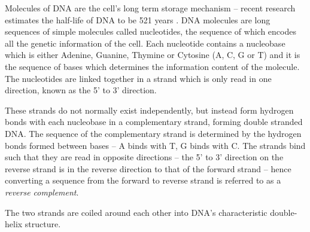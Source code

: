 Molecules of DNA are the cell's long term storage mechanism -- recent research
estimates the half-life of DNA to be 521 years \citep{DNAhalflife}.
DNA molecules are long sequences of simple molecules called nucleotides, the
sequence of  which encodes all the genetic information of the cell.
Each nucleotide contains a nucleobase which is either Adenine, Guanine,
Thymine or Cytosine (A, C, G or T) and it is the sequence of bases 
which determines the information content of the molecule.
The nucleotides are linked together in a strand which is only read in one 
direction, known as the 5' to 3' direction.

These strands do not normally exist independently, but instead form hydrogen
bonds with each nucleobase in a complementary strand, forming double stranded
DNA.
The sequence of the complementary strand is determined by the hydrogen bonds
formed between bases -- A binds with T, G binds with C.
The strands bind such that they are read in opposite directions -- the 5' to 3' 
direction on the reverse strand is in the reverse direction to that of the 
forward strand -- hence converting a sequence from the
forward to reverse strand is referred to as a \emph{reverse complement}.

The two strands are coiled around each other into DNA's characteristic 
double-helix structure.

